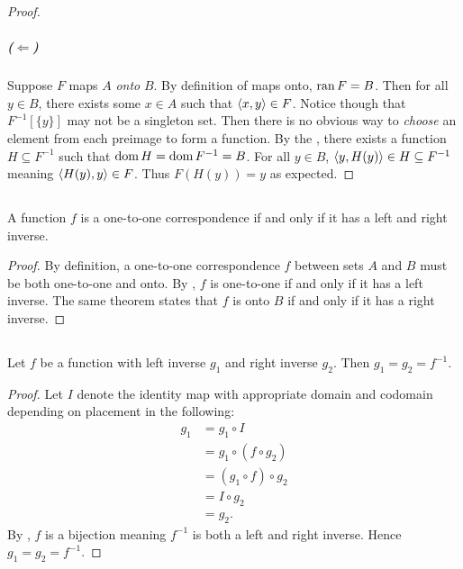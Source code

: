 \documentclass{report}
\begin{document}
\begin{proof}
      \subparagraph{($\Leftarrow$)}%

        Suppose $F$ maps $A$ \textit{onto} $B$.
        By definition of maps onto, $\mathop{\text{ran}}{F} = B$.
        Then for all $y \in B$, there exists some $x \in A$ such that
          $\left< x, y \right> \in F$.
        Notice though that $F^{-1}[\{y\}]$ may not be a singleton set.
        Then there is no obvious way to \textit{choose} an element from each
          preimage to form a function.
        By the , there exists a function
          $H \subseteq F^{-1}$ such that $\mathop{\text{dom}}{H} = \mathop{\text{dom}}{F^{-1}} = B$.
        For all $y \in B$, $\left< y, H(y) \right> \in H \subseteq F^{-1}$
          meaning $\left< H(y), y \right> \in F$.
        Thus $F(H(y)) = y$ as expected.

  \end{proof}

\subsection{}%

  \begin{corollary}
    A function $f$ is a one-to-one correspondence if and only if it has a left
      and right inverse.
  \end{corollary}

  \begin{proof}
    By definition, a one-to-one correspondence $f$ between sets $A$ and $B$ must
      be both one-to-one and onto.
    By , $f$ is one-to-one if and only if it has a left
      inverse.
    The same theorem states that $f$ is onto $B$ if and only if it has a right
      inverse.
  \end{proof}

\subsection{}%

  \begin{lemma}
    Let $f$ be a function with left inverse $g_1$ and right inverse $g_2$.
    Then $g_1 = g_2 = f^{-1}$.
  \end{lemma}

  \begin{proof}
    Let $I$ denote the identity map with appropriate domain and codomain
      depending on placement in the following:
      \begin{align*}
        g_1
          & = g_1 \circ I \\
          & = g_1 \circ (f \circ g_2) \\
          & = (g_1 \circ f) \circ g_2 \\
          & = I \circ g_2 \\
          & = g_2.
      \end{align*}
    By , $f$ is a bijection meaning $f^{-1}$
      is both a left and right inverse.
    Hence $g_1 = g_2 = f^{-1}$.
  \end{proof}
\end{document}
